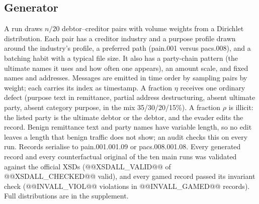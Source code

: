 \documentclass[conference]{IEEEtran}
\begin{document}
\subsection{Generator}
A run draws $n/20$ debtor--creditor pairs with volume weights from a
Dirichlet distribution. Each pair has a creditor industry and a purpose
profile drawn around the industry's profile, a preferred path
(pain.001 versus pacs.008), and a batching habit with a typical file size. It
also has a party-chain pattern (the ultimate names it uses and how often one
appears), an amount scale, and fixed names and addresses. Messages are emitted in time
order by sampling pairs by weight; each carries its index as timestamp. A
fraction $\eta$ receives one ordinary defect (purpose text in remittance,
partial address destructuring, absent ultimate party, absent category
purpose, in the mix 35/30/20/15\%). A fraction $\rho$ is illicit: the listed
party is the ultimate debtor or the debtor, and the evader edits the record.
Benign remittance text and party names have variable length, so no edit
leaves a length that benign traffic does not show; an audit checks this on
every run. Records serialise to pain.001.001.09 or pacs.008.001.08. Every generated
record and every counterfactual original of the ten main runs was validated
against the official XSDs (@@XSDALL_VALID@@ of @@XSDALL_CHECKED@@ valid), and
every gamed record passed its invariant check (@@INVALL_VIOL@@ violations in
@@INVALL_GAMED@@ records). Full distributions are in the supplement.
\end{document}
